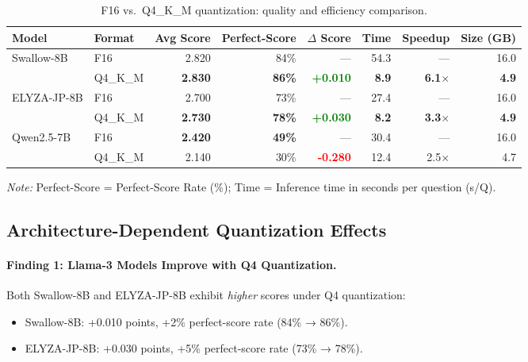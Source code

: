 \documentclass[twocolumn]{article}
\begin{document}
\begin{table}[t]
\centering
\caption{F16 vs.\ Q4\_K\_M quantization: quality and efficiency comparison.}
\label{tab:quant_comparison}
\small
\begin{tabular}{llrrrrrr}
\toprule
\textbf{Model} & \textbf{Format} & \textbf{Avg Score} & \textbf{Perfect-Score} & \textbf{$\Delta$ Score} & \textbf{Time} & \textbf{Speedup} & \textbf{Size (GB)} \\
\midrule
Swallow-8B     & F16      & 2.820 & 84\% & --- & 54.3 & --- & 16.0 \\
               & Q4\_K\_M & \textbf{2.830} & \textbf{86\%} & \textcolor{green}{\textbf{+0.010}} & \textbf{8.9} & \textbf{6.1$\times$} & \textbf{4.9} \\
\midrule
ELYZA-JP-8B    & F16      & 2.700 & 73\% & --- & 27.4 & --- & 16.0 \\
               & Q4\_K\_M & \textbf{2.730} & \textbf{78\%} & \textcolor{green}{\textbf{+0.030}} & \textbf{8.2} & \textbf{3.3$\times$} & \textbf{4.9} \\
\midrule
Qwen2.5-7B     & F16      & \textbf{2.420} & \textbf{49\%} & --- & 30.4 & --- & 16.0 \\
               & Q4\_K\_M & 2.140 & 30\% & \textcolor{red}{\textbf{-0.280}} & 12.4 & 2.5$\times$ & 4.7 \\
\bottomrule
\end{tabular}

\vspace{0.5em}
\textit{Note:} Perfect-Score = Perfect-Score Rate (\%); Time = Inference time in seconds per question (s/Q).
\end{table}

\subsection{Architecture-Dependent Quantization Effects}

\paragraph{Finding 1: Llama-3 Models Improve with Q4 Quantization.}

Both Swallow-8B and ELYZA-JP-8B exhibit \emph{higher} scores under Q4 quantization:
\begin{itemize}
  \item Swallow-8B: +0.010 points, +2\% perfect-score rate (84\% → 86\%).
  \item ELYZA-JP-8B: +0.030 points, +5\% perfect-score rate (73\% → 78\%).
\end{itemize}
\end{document}
